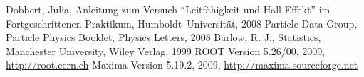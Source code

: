 \renewcommand{\refname}{Literatur und Programme}
\begin{thebibliography}{xxxxxx}
Dobbert, Julia, Anleitung zum Versuch ``Leitfähigkeit und Hall-Effekt'' im Fortgeschrittenen-Praktikum, Humboldt–Universität, 2008
Particle Data Group, Particle Physics Booklet, Physics Letters, 2008
Barlow, R. J., Statistics, Manchester University, Wiley Verlag, 1999
ROOT Version 5.26/00, 2009, \href{http://root.cern.ch}{http://root.cern.ch}
Maxima Version 5.19.2, 2009, \href{http://maxima.sourceforge.net}{http://maxima.sourceforge.net}
\end{thebibliography}